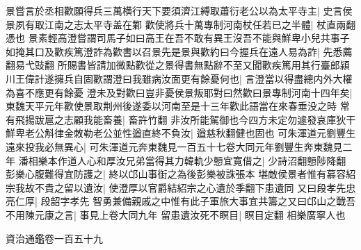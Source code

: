 景嘗言於丞相歡願得兵三萬横行天下要須濟江縛取蕭衍老公以為太平寺主|{
	史言侯景夙有取江南之志太平寺盖在鄴}
歡使將兵十萬專制河南杖任若已之半體|{
	杖直兩翻憑也}
景素輕高澄嘗謂司馬子如曰高王在吾不敢有異王沒吾不能與鮮卑小兒共事子如掩其口及歡疾篤澄詐為歡書以召景先是景與歡約曰今握兵在遠人易為詐|{
	先悉薦翻易弋豉翻}
所賜書皆請加微點歡從之景得書無點辭不至又聞歡疾篤用其行臺郎潁川王偉計遂擁兵自固歡謂澄曰我雖病汝面更有餘憂何也|{
	言澄當以得盡總内外大權為喜不應更有餘憂}
澄未及對歡曰豈非憂侯景叛耶對曰然歡曰景專制河南十四年矣|{
	東魏天平元年歡使景取荆州後遂委以河南至是十三年歡此語當在來春垂没之時}
常有飛揚跋扈之志顧我能畜養|{
	畜許竹翻}
非汝所能駕御也今四方未定勿遽發哀庫狄干鮮卑老公斛律金敇勒老公並性遒直終不負汝|{
	遒慈秋翻健也固也}
可朱渾道元劉豐生遠來投我必無異心|{
	可朱渾道元奔東魏見一百五十七卷大同元年劉豐生奔東魏見二年}
潘相樂本作道人心和厚汝兄弟當得其力韓軌少戅宜寛借之|{
	少詩沼翻戅陟降翻}
彭樂心腹難得宜防護之|{
	終以邙山事衘之為後彭樂被誅張本}
堪敵侯景者惟有慕容紹宗我故不貴之留以遺汝|{
	使澄厚以官爵結紹宗之心遺於季翻下患遺同}
又曰段孝先忠亮仁厚|{
	段韶字孝先}
智勇兼備親戚之中惟有此子軍旅大事宜共籌之又曰邙山之戰吾不用陳元康之言|{
	事見上卷大同九年}
留患遺汝死不瞑目|{
	瞑目定翻}
相樂廣寧人也

資治通鑑卷一百五十九
